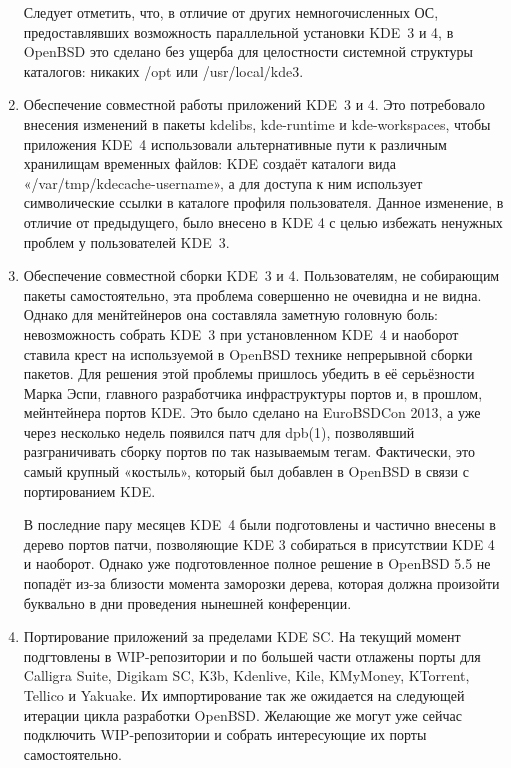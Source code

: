 \documentclass[10pt, a5paper]{article}
\begin{document}
\begin{enumerate}
Следует отметить, что, в отличие от других немногочисленных ОС, предоставлявших возможность параллельной установки KDE~3 и 4, в OpenBSD это сделано без ущерба для целостности системной структуры каталогов: никаких /opt или /usr/local/kde3.
 \item Обеспечение совместной работы приложений KDE~3 и 4. Это потребовало внесения изменений в пакеты kdelibs, kde-runtime и kde-workspaces, чтобы приложения KDE~4 использовали альтернативные пути к различным хранилищам временных файлов: KDE создаёт каталоги вида «/var/tmp/kde\-cache-user\-na\-me», а для доступа к ним использует символические ссылки в каталоге профиля пользователя. Данное изменение, в отличие от предыдущего, было внесено в KDE 4 с целью избежать ненужных проблем у пользователей KDE~3.
 \item Обеспечение совместной сборки KDE~3 и 4. Пользователям, не собирающим пакеты самостоятельно, эта проблема совершенно не очевидна и не видна. Однако для менйтейнеров она составляла заметную головную боль: невозможность собрать KDE~3 при установленном KDE~4 и наоборот ставила крест на используемой в OpenBSD технике непрерывной сборки пакетов. Для решения этой проблемы пришлось убедить в её серьёзности Марка Эспи, главного разработчика инфраструктуры портов и, в прошлом, мейнтейнера портов KDE. Это было сделано на Euro\-BSD\-Con 2013, а уже через несколько недель появился патч для dpb(1), позволявший разграничивать сборку портов по так называемым тегам. Фактически, это самый крупный «костыль», который был добавлен в OpenBSD в связи с портированием KDE.

В последние пару месяцев KDE~4 были подготовлены и частично внесены в дерево портов патчи, позволяющие KDE 3 собираться в присутствии KDE 4 и наоборот. Однако уже подготовленное полное решение в OpenBSD 5.5 не попадёт из-за близости момента заморозки дерева, которая должна произойти буквально в дни проведения нынешней конференции.
 \item Портирование приложений за пределами KDE SC. На текущий момент подгтовлены в WIP-репозитории и по большей части отлажены порты для Calligra Suite, Digikam SC, K3b, Kdenlive, Kile, KMyMoney, KTorrent, Tellico и Yakuake. Их импортирование так же ожидается на следующей итерации цикла разработки OpenBSD. Желающие же могут уже сейчас подключить WIP-репозитории и собрать интересующие их порты самостоятельно.
\end{enumerate}
\end{document}
